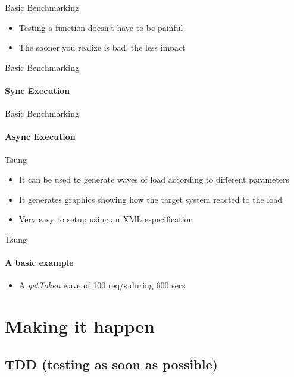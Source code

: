 \documentclass[]{beamer}
\begin{document}
\begin{frame}{Basic Benchmarking}
    \begin{itemize}
    \item Testing a function doesn't have to be painful
    \pause
    \item The sooner you realize is bad, the less impact
    \pause
        
    \end{itemize}
\end{frame}

\begin{frame}{Basic Benchmarking}
    \framesubtitle{Sync Execution}
    
\end{frame}

\begin{frame}{Basic Benchmarking}
    \framesubtitle{Async Execution}
    
\end{frame}

\begin{frame}{Tsung}
    \begin{itemize}
    \pause
    \item It can be used to generate waves of load according to different parameters
    \pause
    \item It generates graphics showing how the target system reacted to the load
    \pause
    \item Very easy to setup using an XML especification
    \end{itemize}
\end{frame}

\begin{frame}{Tsung}
    \framesubtitle{A basic example}
    \begin{itemize}
    \item A \emph{getToken} wave of 100 req/s during 600 secs
    
    \end{itemize}
\end{frame}

\section*{Making it happen}
\label{making_it_happen}

\subsection*{TDD (testing as soon as possible)}
\label{tdd}
\end{document}
